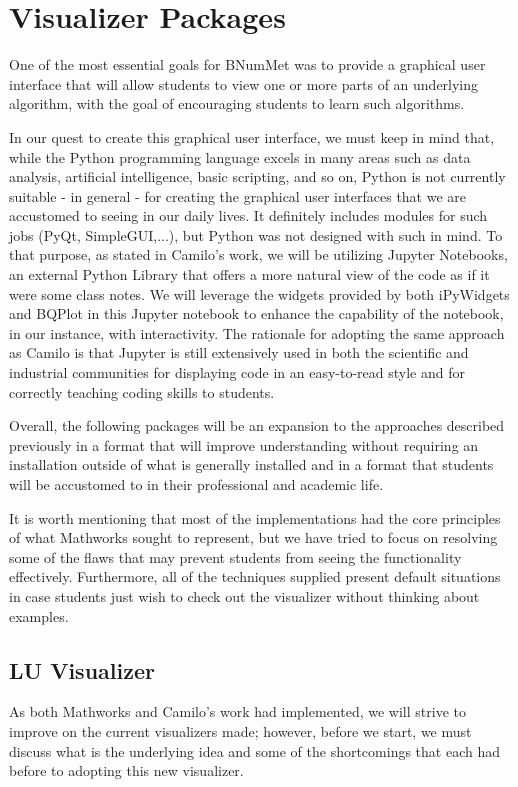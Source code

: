 \section{Visualizer Packages}
One of the most essential goals for BNumMet was to provide a graphical user interface that will allow students to view one or more parts of an underlying algorithm, with the goal of encouraging students to learn such algorithms.

In our quest to create this graphical user interface, we must keep in mind that, while the Python programming language excels in many areas such as data analysis, artificial intelligence, basic scripting, and so on, Python is not currently suitable - in general - for creating the graphical user interfaces that we are accustomed to seeing in our daily lives. It definitely includes modules for such jobs (PyQt, SimpleGUI,...), but Python was not designed with such in mind. To that purpose, as stated in Camilo's work, we will be utilizing Jupyter Notebooks, an external Python Library that offers a more natural view of the code as if it were some class notes. We will leverage the widgets provided by both iPyWidgets and BQPlot in this Jupyter notebook to enhance the capability of the notebook, in our instance, with  interactivity.  The rationale for adopting the same approach as Camilo is that Jupyter is still extensively used in both the scientific and industrial communities for displaying code in an easy-to-read style and for correctly teaching coding skills to students.

Overall, the following packages will be an expansion to the approaches described previously in a format that will improve understanding without requiring an installation outside of what is generally installed and in a format that students will be accustomed to in their professional and academic life.

It is worth mentioning that most of the implementations had the core principles of what Mathworks sought to represent, but we have tried to focus on resolving some of the flaws that may prevent students from seeing the functionality effectively. Furthermore, all of the techniques supplied present default situations in case students just wish to check out the visualizer without thinking about examples.

\subsection{LU Visualizer}
As both Mathworks and Camilo's work had implemented, we will strive to improve on the current visualizers made; however, before we start, we must discuss what is the underlying idea and some of the shortcomings that each had before to adopting this new visualizer.

